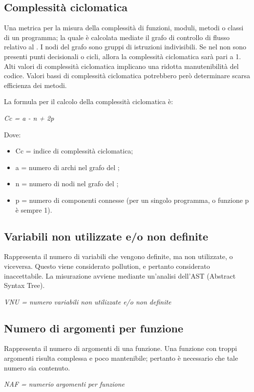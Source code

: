   \subsection{Complessità ciclomatica}
Una metrica per la misura della complessità di funzioni, moduli, metodi o classi di un programma; la quale è calcolata mediate il grafo di controllo di flusso relativo al .
            I nodi del grafo sono gruppi di istruzioni indivisibili. Se nel  non sono presenti punti decisionali o cicli, allora la complessità ciclomatica sarà pari a 1.
            Alti valori di complessità ciclomatica implicano una ridotta manutenibilità del codice. Valori bassi di complessità ciclomatica potrebbero però determinare scarsa efficienza dei metodi.
  
  La formula per il
  calcolo della complessità ciclomatica è:
  \begin{center}
    \emph{Cc = a - n + 2p}
  \end{center}
  Dove:
  \begin{itemize}
    \item Cc = indice di complessità ciclomatica;
    \item a = numero di archi nel grafo del ;
    \item n = numero di nodi nel grafo del ;
    \item p = numero di componenti connesse (per un singolo programma,  o funzione p è sempre 1).
  \end{itemize}

  \subsection{Variabili non utilizzate e/o non definite}
Rappresenta il numero di variabili che vengono definite, ma non utilizzate, o viceversa. Questo viene considerato pollution, e pertanto considerato inaccettabile. La misurazione avviene mediante un’analisi dell’AST (Abstract Syntax Tree).
  \begin{center}
    \emph{VNU = numero variabili non utilizzate e/o non definite}
  \end{center}

  \subsection{Numero di argomenti per funzione}
  Rappresenta il numero di argomenti di una funzione. Una funzione con troppi argomenti risulta complessa e poco mantenibile; pertanto è necessario che tale numero sia contenuto.
  \begin{center}
    \emph{NAF = numerio argomenti per funzione}
  \end{center}

